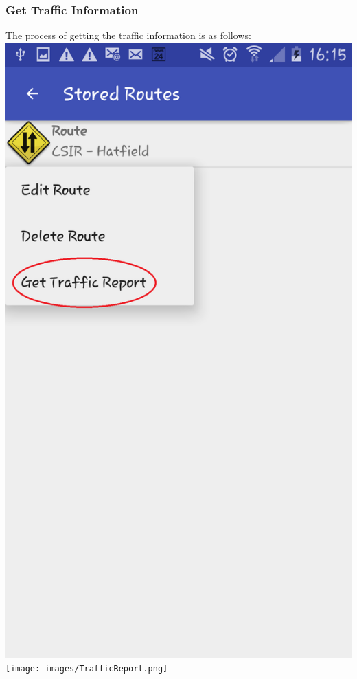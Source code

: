\documentclass[a4paper,12pt]{article}
\begin{document}
\subsubsection{Get Traffic Information}
The process of getting the traffic information is as follows:
\includegraphics[width=\textwidth]{images/TrafficReportOption.png}
\texttt{[image: images/TrafficReport.png]}
\end{document}
